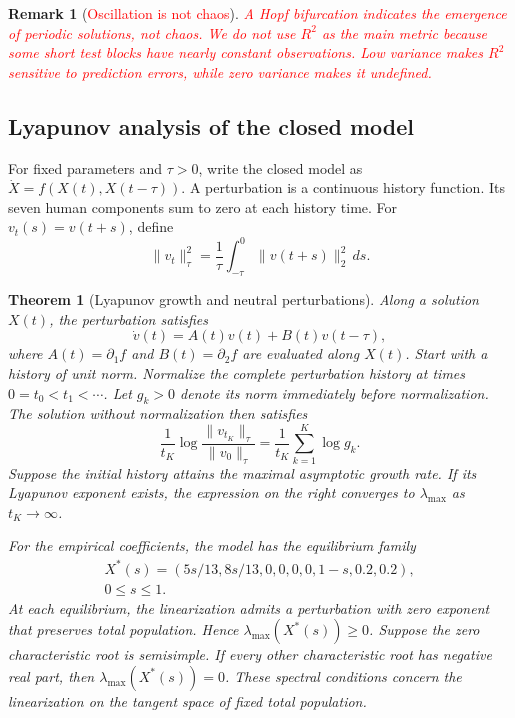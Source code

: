 \documentclass[letterpaper,journal]{IEEEtran}
\newtheorem{remark}{Remark}[section]
\newtheorem{theorem}{Theorem}[section]
\begin{document}
	\begingroup
	\renewcommand{\theremark}{\thesection}
	\begin{remark}[\textcolor{red}{Oscillation is not chaos}]
	\textcolor{red}{
	A Hopf bifurcation indicates the emergence of periodic solutions, not chaos. 
	We do not use $R^2$ as the main metric because some short test blocks have nearly constant observations. 
	Low variance makes $R^2$ sensitive to prediction errors, while zero variance makes it undefined.}
	\end{remark}
	\endgroup


\subsection{Lyapunov analysis of the closed model}
\begingroup\color{red}
For fixed parameters and $\tau>0$, write the closed model as
$\dot X=f(X(t),X(t-\tau))$.
A perturbation is a continuous history function.
Its seven human components sum to zero at each history time.
For $v_t(s)=v(t+s)$, define
\[
\|v_t\|_\tau^2
=\frac{1}{\tau}\int_{-\tau}^{0}\|v(t+s)\|_2^2\,ds.
\]

\begin{theorem}[Lyapunov growth and neutral perturbations]
\label{thm:lyapunov_quantification}
Along a solution $X(t)$, the perturbation satisfies
\begin{equation}
\dot v(t)=A(t)v(t)+B(t)v(t-\tau),
\label{eq:lyapunov_variation}
\end{equation}
where $A(t)=\partial_1 f$ and $B(t)=\partial_2 f$
are evaluated along $X(t)$.
Start with a history of unit norm.
Normalize the complete perturbation history at times
$0=t_0<t_1<\cdots$.
Let $g_k>0$ denote its norm immediately before normalization.
The solution without normalization then satisfies
\begin{equation}
\frac{1}{t_K}
\log\frac{\|v_{t_K}\|_\tau}{\|v_0\|_\tau}
=
\frac{1}{t_K}\sum_{k=1}^{K}\log g_k.
\label{eq:lyapunov_growth_identity}
\end{equation}
Suppose the initial history attains the maximal asymptotic
growth rate.
If its Lyapunov exponent exists, the expression on the right
converges to $\lambda_{\max}$ as $t_K\to\infty$.

For the empirical coefficients, the model has the equilibrium family
\begin{equation}
\begin{gathered}
X^*(s)=(5s/13,8s/13,0,0,0,0,1-s,0.2,0.2),\\
0\le s\le1.
\end{gathered}
\label{eq:closed_equilibrium_family}
\end{equation}
At each equilibrium, the linearization admits a perturbation
with zero exponent that preserves total population.
Hence $\lambda_{\max}(X^*(s))\ge0$.
Suppose the zero characteristic root is semisimple.
If every other characteristic root has negative real part,
then $\lambda_{\max}(X^*(s))=0$.
These spectral conditions concern the linearization
on the tangent space of fixed total population.
\end{theorem}
\end{document}
